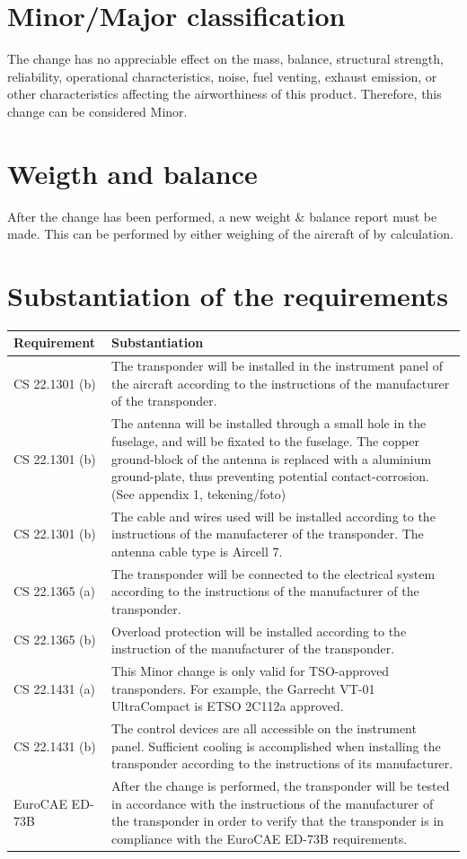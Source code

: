 \documentclass{article}
\begin{document}
\section{Minor/Major classification}
The change has no appreciable effect on the mass, balance, structural strength, reliability, operational characteristics, noise, fuel venting, exhaust emission, or other characteristics affecting the airworthiness of this product. Therefore, this change can be considered Minor.

\section{Weigth and balance}
After the change has been performed, a new weight \& balance report must be made. This can be performed by either weighing of the aircraft of by calculation.

\section{Substantiation of the requirements}
\begin{tabular}{|l|p{10cm}|}
\hline
Requirement & Substantiation \\
\hline
CS 22.1301 (b) & The transponder will be installed in the instrument panel of the aircraft according to the instructions of the manufacturer of the transponder. \\
\hline
CS 22.1301 (b) & The antenna will be installed through a small hole in the fuselage, and will be fixated to the fuselage. The copper ground-block of the antenna is replaced with a aluminium ground-plate, thus preventing potential contact-corrosion. (See appendix 1, tekening/foto) \\
\hline
CS 22.1301 (b) & The cable and wires used will be installed according to the instructions of the manufacterer of the transponder. The antenna cable type is Aircell 7. \\
\hline
CS 22.1365 (a) & The transponder will be connected to the electrical system according to the instructions of the manufacturer of the transponder. \\
\hline
CS 22.1365 (b) & Overload protection will be installed according to the instruction of the manufacturer of the transponder. \\
\hline
CS 22.1431 (a) & This Minor change is only valid for TSO-approved transponders. For example, the Garrecht VT-01 UltraCompact is ETSO 2C112a approved. \\
\hline
CS 22.1431 (b) & The control devices are all accessible on the instrument panel. Sufficient cooling is accomplished when installing the transponder according to the instructions of its manufacturer. \\
\hline
EuroCAE ED-73B & After the change is performed, the transponder will be tested in accordance with the instructions of the manufacturer of the transponder in order to verify that the transponder is in compliance with the EuroCAE ED-73B requirements. \\
\hline
\end{tabular}
\end{document}
